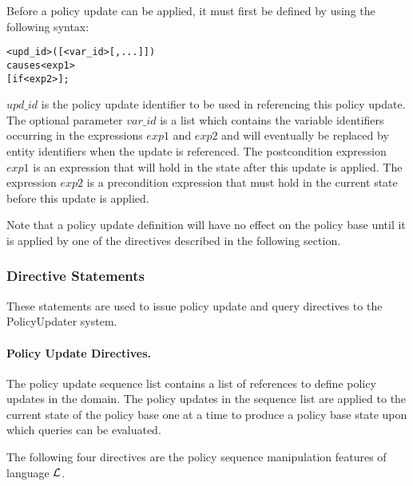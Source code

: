\documentclass[glov2,twocolumn,final]{svjour2}
\newenvironment{vverbatim}
  {\begin{alltt}}
  {\vspace{-\baselineskip}\end{alltt}}
\begin{document}
          Before a policy update can be applied, it must first be defined by
          using the following syntax:

          \begin{vverbatim}
  <upd\_id>([<var\_id>[, ...]])
    causes <exp1>
    [if <exp2>];
          \end{vverbatim}

          $upd\_id$ is the policy update identifier to be used in referencing
          this policy update. The optional parameter $var\_id$ is a list which
          contains the variable identifiers occurring in the expressions $exp1$
          and $exp2$ and will eventually be replaced by entity identifiers when
          the update is referenced. The postcondition expression $exp1$ is an
          expression that will hold in the state after this update is applied.
          The expression $exp2$ is a precondition expression that must hold in
          the current state before this update is applied.

          Note that a policy update definition will have no effect on the
          policy base until it is applied by one of the directives described in
          the following section.

        \subsubsection{Directive Statements}

          These statements are used to issue policy update and query directives
          to the PolicyUpdater system.

        \paragraph{Policy Update Directives.}

        The policy update sequence list contains a list of references to
        define policy updates in the domain. The policy updates in the
        sequence list are applied to the current state of the policy base one
        at a time to produce a policy base state upon which queries can be
        evaluated.

        The following four directives are the policy sequence manipulation
        features of language $\cal{L}$.
\end{document}
